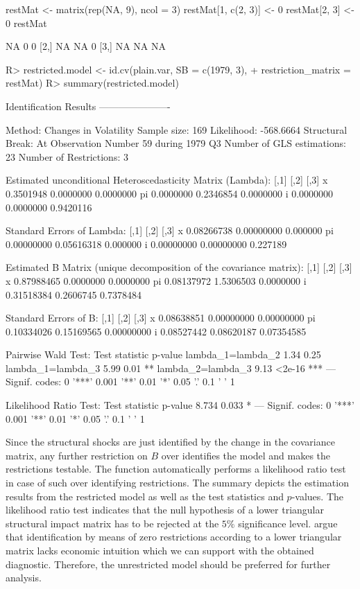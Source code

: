 \documentclass[nojss]{jss}\usepackage[]{graphicx}\usepackage[]{color}
\begin{document}
\begin{CodeChunk}
\begin{CodeInput}
restMat <- matrix(rep(NA, 9), ncol = 3)
restMat[1, c(2, 3)] <- 0
restMat[2, 3] <- 0
restMat
\end{CodeInput}
\begin{CodeOutput}
     [,1] [,2] [,3]
[1,]   NA    0    0
[2,]   NA   NA    0
[3,]   NA   NA   NA
\end{CodeOutput}
\begin{CodeInput}
R> restricted.model <- id.cv(plain.var, SB = c(1979, 3),
+    restriction_matrix = restMat)
R> summary(restricted.model)
\end{CodeInput}
\begin{CodeOutput}
Identification Results
----------------------

Method: Changes in Volatility
Sample size: 169
Likelihood: -568.6664
Structural Break: At Observation Number 59 during 1979 Q3
Number of GLS estimations: 23
Number of Restrictions: 3

Estimated unconditional Heteroscedasticity Matrix (Lambda):
        [,1]      [,2]      [,3]
x  0.3501948 0.0000000 0.0000000
pi 0.0000000 0.2346854 0.0000000
i  0.0000000 0.0000000 0.9420116

Standard Errors of Lambda:
         [,1]       [,2]     [,3]
x  0.08266738 0.00000000 0.000000
pi 0.00000000 0.05616318 0.000000
i  0.00000000 0.00000000 0.227189

Estimated B Matrix (unique decomposition of the covariance matrix):
         [,1]      [,2]      [,3]
x  0.87988465 0.0000000 0.0000000
pi 0.08137972 1.5306503 0.0000000
i  0.31518384 0.2606745 0.7378484

Standard Errors of B:
         [,1]       [,2]       [,3]
x  0.08638851 0.00000000 0.00000000
pi 0.10334026 0.15169565 0.00000000
i  0.08527442 0.08620187 0.07354585

Pairwise Wald Test:
                  Test statistic p-value
lambda_1=lambda_2           1.34    0.25
lambda_1=lambda_3           5.99    0.01 **
lambda_2=lambda_3           9.13  <2e-16 ***
---
Signif. codes:  0 '***' 0.001 '**' 0.01 '*' 0.05 '.' 0.1 ' ' 1

Likelihood Ratio Test:
 Test statistic p-value
          8.734   0.033 *
---
Signif. codes:  0 '***' 0.001 '**' 0.01 '*' 0.05 '.' 0.1 ' ' 1
\end{CodeOutput}
\end{CodeChunk}
Since the structural shocks are just identified by the change in the covariance matrix, any further restriction on $B$ over identifies the model and makes the restrictions testable. The function automatically performs a likelihood ratio test in case of such over identifying restrictions. The summary depicts the estimation results from the restricted model as well as the test statistics and $p$-values. The likelihood ratio test indicates that the null hypothesis of a lower triangular  structural impact matrix has to be rejected at the $5\%$ significance level. \cite{HerwartzPloedt2016} argue that identification by means of zero restrictions according to a lower triangular matrix lacks economic intuition which we can support with the obtained diagnostic. Therefore, the unrestricted model should be preferred for further analysis.
\end{document}
